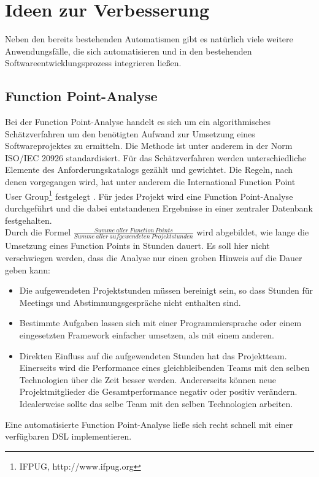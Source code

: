 \documentclass[a4paper,12pt]{scrreprt}
\begin{document}
\section{Ideen zur Verbesserung}
\label{sec:verbesserung}
Neben den bereits bestehenden Automatismen gibt es natürlich viele weitere Anwendungsfälle, die sich automatisieren und in den bestehenden Softwareentwicklungsprozess integrieren ließen. 
\subsection{Function Point-Analyse}
\label{sub:fpa}
Bei der Function Point-Analyse handelt es sich um ein algorithmisches Schätzverfahren um den benötigten Aufwand zur Umsetzung eines Softwareprojektes zu ermitteln. Die Methode ist unter anderem in der Norm ISO/IEC 20926 standardisiert. Für das Schätzverfahren werden unterschiedliche Elemente des Anforderungskatalogs gezählt und gewichtet. Die Regeln, nach denen vorgegangen wird, hat unter anderem die International Function Point User Group\footnote{IFPUG, http://www.ifpug.org} festgelegt \cite{bal2009}.
Für jedes Projekt wird eine Function Point-Analyse durchgeführt und die dabei entstandenen Ergebnisse in einer zentraler Datenbank festgehalten.\\
Durch die Formel 
$\frac{Summe\ aller\ Function\ Points}{Summe\ aller\ aufgewendeten\ Projektstunden}$ wird abgebildet, wie lange die Umsetzung eines Function Points in Stunden dauert. Es soll hier nicht verschwiegen werden, dass die Analyse nur einen groben Hinweis auf die Dauer geben kann:
\begin{itemize}
	\item Die aufgewendeten Projektstunden müssen bereinigt sein, so dass Stunden für Meetings und Abstimmungsgespräche nicht enthalten sind.
	\item Bestimmte Aufgaben lassen sich mit einer Programmiersprache oder einem eingesetzten Framework einfacher umsetzen, als mit einem anderen.
	\item Direkten Einfluss auf die aufgewendeten Stunden hat das Projektteam. Einerseits wird die Performance eines gleichbleibenden Teams mit den selben Technologien über die Zeit besser werden. Andererseits können neue Projektmitglieder die Gesamtperformance negativ oder positiv verändern. Idealerweise sollte das selbe Team mit den selben Technologien arbeiten. 
\end{itemize}
Eine automatisierte Function Point-Analyse ließe sich recht schnell mit einer verfügbaren DSL implementieren.
\end{document}
